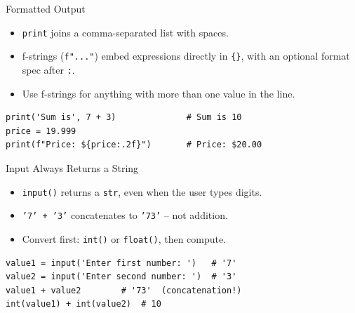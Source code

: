 \documentclass{beamer}
\begin{document}
\begin{frame}[fragile]{Formatted Output}
\begin{itemize}
    \item \texttt{print} joins a comma-separated list with spaces.
    \item f-strings (\texttt{f"..."}) embed expressions directly in \texttt{\{\}}, with an optional format spec after \texttt{:}.
    \item Use f-strings for anything with more than one value in the line.
\end{itemize}
\begin{verbatim}
print('Sum is', 7 + 3)              # Sum is 10
price = 19.999
print(f"Price: ${price:.2f}")       # Price: $20.00
\end{verbatim}
\end{frame}

\begin{frame}[fragile]{Input Always Returns a String}
\begin{itemize}
    \item \texttt{input()} returns a \texttt{str}, even when the user types digits.
    \item \texttt{'7' + '3'} concatenates to \texttt{'73'} -- not addition.
    \item Convert first: \texttt{int()} or \texttt{float()}, then compute.
\end{itemize}
\begin{verbatim}
value1 = input('Enter first number: ')   # '7'
value2 = input('Enter second number: ')  # '3'
value1 + value2        # '73'  (concatenation!)
int(value1) + int(value2)  # 10
\end{verbatim}
\end{frame}
\end{document}
